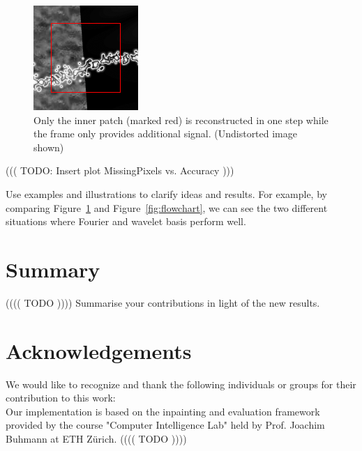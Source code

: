 \documentclass[10pt,conference,compsocconf]{IEEEtran}
\begin{document}
\begin{figure}[tbp]
  \centering
  \includegraphics[width=\columnwidth]{images/imageFraming.png}
  \caption{Only the inner patch (marked red) is reconstructed in one step while the frame only provides additional signal. (Undistorted image shown) }
  \label{fig:framing}
\end{figure}

((( TODO: Insert plot MissingPixels vs. Accuracy )))

Use examples and illustrations to clarify ideas and results. For
example, by comparing Figure~\ref{fig:framing} and
Figure~\ref{fig:flowchart}, we can see the two different
situations where Fourier and wavelet basis perform well. 

\section{Summary}
(((( TODO ))))
  Summarise your contributions in light of the new
  results.
  

\section*{Acknowledgements}
We would like to recognize and thank the following individuals or groups for their contribution to this work:\\
Our implementation is based on the inpainting and evaluation framework provided by the course "Computer Intelligence Lab" held by Prof. Joachim Buhmann at ETH Zürich.
(((( TODO ))))
\end{document}
